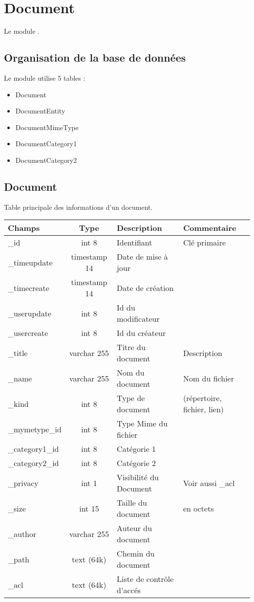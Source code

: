 

\clearpage
\section{Document}

Le module \doc \obm.

\subsection{Organisation de la base de données}

Le module \doc utilise 5 tables :
\begin{itemize}
 \item Document
 \item DocumentEntity
 \item DocumentMimeType
 \item DocumentCategory1
 \item DocumentCategory2
\end{itemize}

\subsection{Document}
Table principale des informations d'un document.\\

\begin{tabular}{|p{3cm}|c|p{5.4cm}|p{2.6cm}|}
\hline
\textbf{Champs} & \textbf{Type} & \textbf{Description} & \textbf{Commentaire} \\
\hline
\_id & int 8 & Identifiant & Clé primaire \\
\hline
\_timeupdate & timestamp 14 & Date de mise à jour & \\
\hline
\_timecreate & timestamp 14 & Date de création & \\
\hline
\_userupdate & int 8 & Id du modificateur & \\
\hline
\_usercreate & int 8 & Id du créateur & \\
\hline
\_title & varchar 255 & Titre du document & Description\\
\hline
\_name & varchar 255 & Nom du document & Nom du fichier\\
\hline
\_kind & int 8 & Type de document & (répertoire, fichier, lien)\\
\hline
\_mymetype\_id & int 8 & Type Mime du fichier & \\
\hline
\_category1\_id & int 8 & Catégorie 1 &\\
\hline
\_category2\_id & int 8 & Catégorie 2 &\\
\hline
\_privacy & int 1 & Visibilité du Document & Voir aussi \_acl\\
\hline
\_size & int 15 & Taille du document & en octets \\
\hline
\_author & varchar 255 & Auteur du document & \\
\hline
\_path & text (64k) & Chemin du document &\\
\hline
\_acl & text (64k) & Liste de contrôle d'accés &\\
\hline
\end{tabular}

